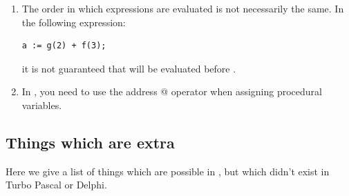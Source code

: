 \begin{enumerate}
there can be only one destructor. This restriction can also be removed by
using the  switch.
\item The order in which expressions are evaluated is not necessarily the
same. In the following expression:
\begin{verbatim}
a := g(2) + f(3);
\end{verbatim}
it is not guaranteed that  will be evaluated before .
\item In \fpc, you need to use the address @ operator when assigning procedural
variables.
\end{enumerate}

\subsection{Things which are extra}
Here we give a list of things which are possible in \fpc, but which
didn't exist in Turbo Pascal or Delphi.
